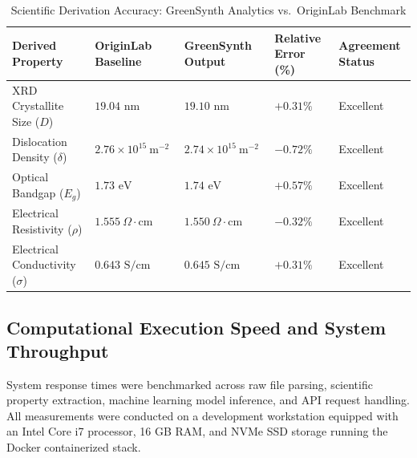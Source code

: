 \documentclass[12pt,a4paper,oneside]{report}
\begin{document}
{{{\begin{table}[!htbp]
\centering
\footnotesize
\setlength{\tabcolsep}{6pt}
\renewcommand{\arraystretch}{1.2}
\caption{Scientific Derivation Accuracy: GreenSynth Analytics vs.\ OriginLab Benchmark}
\label{tab:perf_accuracy}
\begin{tabular}{|p{4.0cm}|p{2.3cm}|p{2.3cm}|p{2.0cm}|p{1.8cm}|}
\hline
\textbf{Derived Property} & \textbf{OriginLab Baseline} & \textbf{GreenSynth Output} & \textbf{Relative Error (\%)} & \textbf{Agreement Status} \\
\hline
XRD Crystallite Size ($D$) & $19.04\text{ nm}$ & $19.10\text{ nm}$ & $+0.31\%$ & Excellent \\
Dislocation Density ($\delta$) & $2.76 \times 10^{15}\ \text{m}^{-2}$ & $2.74 \times 10^{15}\ \text{m}^{-2}$ & $-0.72\%$ & Excellent \\
Optical Bandgap ($E_g$) & $1.73\text{ eV}$ & $1.74\text{ eV}$ & $+0.57\%$ & Excellent \\
Electrical Resistivity ($\rho$) & $1.555\ \Omega\cdot\text{cm}$ & $1.550\ \Omega\cdot\text{cm}$ & $-0.32\%$ & Excellent \\
Electrical Conductivity ($\sigma$) & $0.643\text{ S/cm}$ & $0.645\text{ S/cm}$ & $+0.31\%$ & Excellent \\
\hline
\end{tabular}
\end{table}

\subsection{Computational Execution Speed and System Throughput}

System response times were benchmarked across raw file parsing, scientific property extraction, machine learning model inference, and API request handling. All measurements were conducted on a development workstation equipped with an Intel Core i7 processor, 16 GB RAM, and NVMe SSD storage running the Docker containerized stack.

}}}
\end{document}
